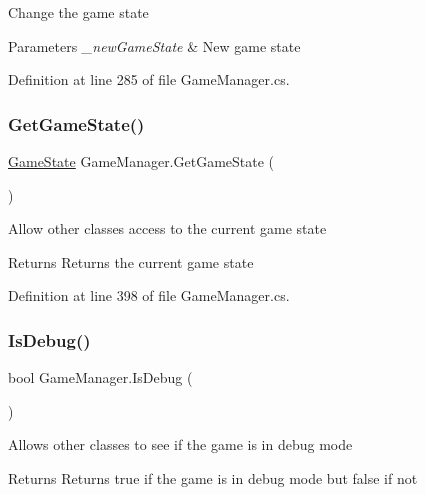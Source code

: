 Change the game state 


\begin{DoxyParams}{Parameters}
{\em \+\_\+new\+Game\+State} & New game state\\
\hline
\end{DoxyParams}


Definition at line 285 of file Game\+Manager.\+cs.

\mbox{\label{class_game_manager_a58134230a7cde001ebf2b25f1dcd6091}} 
\subsubsection{\texorpdfstring{Get\+Game\+State()}{GetGameState()}}
{\footnotesize\ttfamily \mbox{\hyperlink{_game_manager_8cs_a7899b65f1ea0f655e4bbf8d2a5714285}{Game\+State}} Game\+Manager.\+Get\+Game\+State (\begin{DoxyParamCaption}{ }\end{DoxyParamCaption})}



Allow other classes access to the current game state 

\begin{DoxyReturn}{Returns}
Returns the current game state
\end{DoxyReturn}


Definition at line 398 of file Game\+Manager.\+cs.

\mbox{\label{class_game_manager_a35822d3c950f5d43e34c2f020d46c23d}} 
\subsubsection{\texorpdfstring{Is\+Debug()}{IsDebug()}}
{\footnotesize\ttfamily bool Game\+Manager.\+Is\+Debug (\begin{DoxyParamCaption}{ }\end{DoxyParamCaption})}



Allows other classes to see if the game is in debug mode 

\begin{DoxyReturn}{Returns}
Returns true if the game is in debug mode but false if not
\end{DoxyReturn}


